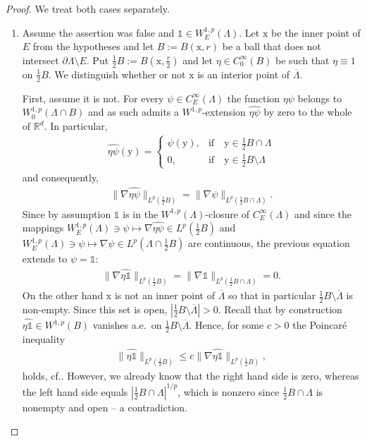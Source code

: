 \documentclass[10pt,leqno]{amsart}
\theoremstyle{definition}
\numberwithin{equation}{section}
\begin{document}
\begin{proof}
We treat both cases separately.
 \begin{enumerate}
  \item Assume the assertion was false and $\mathds{1} \in
	W_E^{1,p}(\Lambda)$. Let ${{\mathrm x}}$ be the inner point of $E$ from the
	hypotheses and let $B := B({{\mathrm x}},r)$ be a ball that does not
	intersect $\partial \Lambda \setminus E$. Put $\frac{1}{2}B:= B({{\mathrm x}}
	,\frac{r}{2})$ and let $\eta \in C^\infty_0(B)$ be such that $\eta
	\equiv 1$ on $\frac{1}{2} B$. We distinguish whether or not ${{\mathrm x}}$ is an
	interior point of $\overline{\Lambda}$.

	First, assume it is not. For every $\psi \in C^\infty_E(\Lambda)$
	the function $\eta \psi$ belongs to $W^{1,p}_0(\Lambda \cap B)$ and as
	such admits a $W^{1,p}$-extension $\widehat {\eta \psi}$ by zero to the
	whole of ${{\mathbb R}}^d$. In particular,
	\begin{align*}
	  \widehat{\eta \psi} ({{\mathrm y}}) =
		\begin{cases}
		  \psi ({{\mathrm y}}), & \text{if} \quad {{\mathrm y}} \in 
			  \frac{1}{2} B \cap \Lambda\\
		  0, & \text{if} \quad {{\mathrm y}} \in \frac{1}{2} B
			  \setminus \Lambda
		\end{cases}
	\end{align*}
	and consequently,
	\begin{align*}
	  \|\nabla \widehat{\eta \psi}\|_{L^p(\frac{1}{2}B)} =
		\|\nabla \psi\|_{L^p(\frac{1}{2} B \cap \Lambda)}.
	\end{align*}
	Since by assumption $\mathds{1}$ is in the
	$W^{1,p}(\Lambda)$-closure of $C^\infty_E(\Lambda)$ and since the
        mappings $W^{1,p}_E(\Lambda) \ni \psi \mapsto \nabla \widehat{\eta \psi}
	\in L^p(\frac{1}{2}B)$ and $W^{1,p}_E(\Lambda) \ni \psi
	\mapsto \nabla \psi \in L^p(\Lambda \cap \frac{1}{2}B)$
	are continuous, the previous equation extends to $\psi = \mathds{1}$:
	\begin{align*}
	  \|\nabla \widehat{\eta \mathds{1}}\|_{L^p(\frac{1}{2}B)}
	  = \|\nabla \mathds{1}\|_{L^p(\frac{1}{2} B \cap \Lambda)}
	  = 0.
	\end{align*}
	On the other hand ${{\mathrm x}}$ is not an inner point of
	$\overline{\Lambda}$ so that in particular $\frac{1}{2} B \setminus
	\overline{\Lambda}$ is non-empty. Since this set is open, $|\frac{1}{2}
	B \setminus \overline{\Lambda}| > 0$.
	Recall that by construction $\widehat{\eta \mathds{1}} \in W^{1,p}(B)$
	vanishes a.e.\ on $\frac{1}{2} B \setminus \overline{\Lambda}$. Hence,
	for some $c > 0$ the Poincar\'e inequality
	\begin{align*}
	  \|\widehat{\eta \mathds{1}}\|_{L^p(\frac{1}{2} B)} \le c
		\|\nabla \widehat{\eta \mathds{1}}
		\|_{L^p(\frac{1}{2} B)},
	\end{align*}
	holds, cf.\@ \cite[Thm.~4.4.2]{ziemer}. However, we already know that
	the right hand side is zero, whereas the left hand side equals
	$|\frac{1}{2} B \cap \Lambda|^{1/p}$, which is nonzero
	since $\frac{1}{2} B \cap \Lambda$ is nonempty and open --  a
	contradiction. 


\end{enumerate}
\end{proof}
\end{document}
